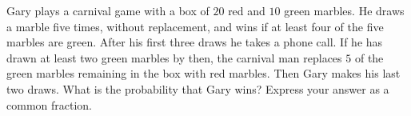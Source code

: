 Gary plays a carnival game with a box of $20$ red and $10$ green marbles. He draws a marble five times, without replacement, and wins if at least four of the five marbles are green. After his first three draws he takes a phone call. If he has drawn at least two green marbles by then, the carnival man replaces $5$ of the green marbles remaining in the box with red marbles. Then Gary makes his last two draws. What is the probability that Gary wins? Express your answer as a common fraction.
